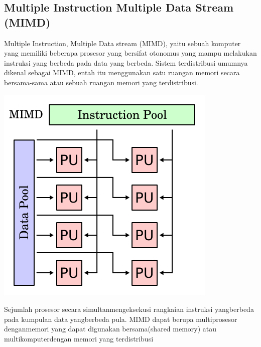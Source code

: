 \documentclass[a4paper,12pt]{article}
\begin{document}
\subsection{Multiple Instruction Multiple Data Stream (MIMD)}
Multiple Instruction, Multiple Data stream (MIMD), yaitu sebuah komputer yang memiliki beberapa prosesor yang bersifat otonomus yang mampu melakukan instruksi yang berbeda pada data yang berbeda. Sistem terdistribusi umumnya dikenal sebagai MIMD, entah itu menggunakan satu ruangan memori secara bersama-sama atau sebuah ruangan memori yang terdistribusi.
\begin{center}
    \includegraphics[width=0.8\linewidth]{mimd.png}
\end{center}
Sejumlah prosesor secara simultanmengeksekusi rangkaian instruksi yangberbeda pada kumpulan data yangberbeda pula.
MIMD dapat berupa multiprosesor denganmemori yang dapat digunakan bersama(shared memory) atau multikomputerdengan memori yang terdistribusi
\end{document}
